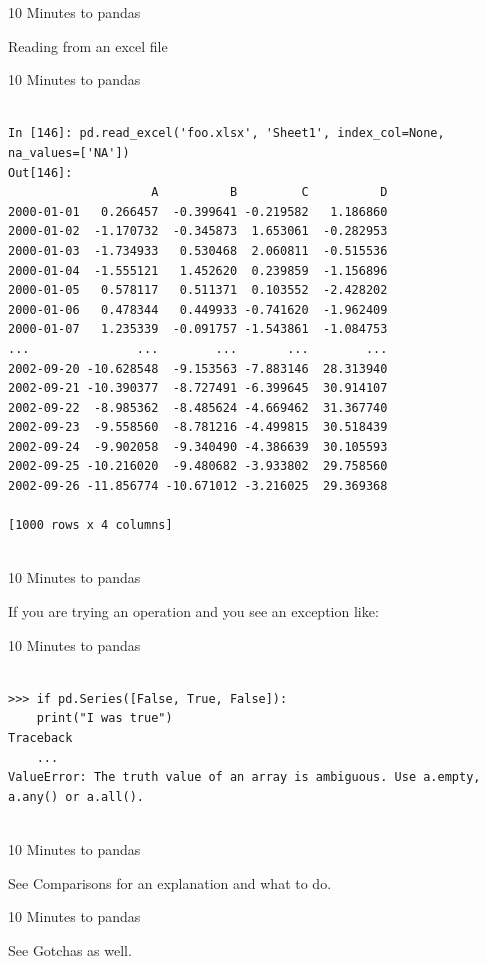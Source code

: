 \documentclass{beamer}
\begin{document}
\begin{frame}[t]{10 Minutes to pandas}

Reading from an excel file

\end{frame}


\begin{frame}[t,fragile]{10 Minutes to pandas}


	\scriptsize
\begin{verbatim}

In [146]: pd.read_excel('foo.xlsx', 'Sheet1', index_col=None, na_values=['NA'])
Out[146]: 
                    A          B         C          D
2000-01-01   0.266457  -0.399641 -0.219582   1.186860
2000-01-02  -1.170732  -0.345873  1.653061  -0.282953
2000-01-03  -1.734933   0.530468  2.060811  -0.515536
2000-01-04  -1.555121   1.452620  0.239859  -1.156896
2000-01-05   0.578117   0.511371  0.103552  -2.428202
2000-01-06   0.478344   0.449933 -0.741620  -1.962409
2000-01-07   1.235339  -0.091757 -1.543861  -1.084753
...               ...        ...       ...        ...
2002-09-20 -10.628548  -9.153563 -7.883146  28.313940
2002-09-21 -10.390377  -8.727491 -6.399645  30.914107
2002-09-22  -8.985362  -8.485624 -4.669462  31.367740
2002-09-23  -9.558560  -8.781216 -4.499815  30.518439
2002-09-24  -9.902058  -9.340490 -4.386639  30.105593
2002-09-25 -10.216020  -9.480682 -3.933802  29.758560
2002-09-26 -11.856774 -10.671012 -3.216025  29.369368

[1000 rows x 4 columns]


\end{verbatim}


\end{frame}


\begin{frame}[t]{10 Minutes to pandas}

If you are trying an operation and you see an exception like:

\end{frame}


\begin{frame}[t,fragile]{10 Minutes to pandas}


	\scriptsize
\begin{verbatim}

>>> if pd.Series([False, True, False]):
    print("I was true")
Traceback
    ...
ValueError: The truth value of an array is ambiguous. Use a.empty, a.any() or a.all().


\end{verbatim}


\end{frame}


\begin{frame}[t]{10 Minutes to pandas}

See Comparisons for an explanation and what to do.

\end{frame}


\begin{frame}[t]{10 Minutes to pandas}

See Gotchas as well.

\end{frame}
\end{document}
